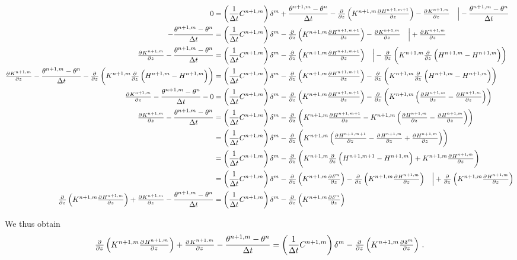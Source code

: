\begin{landscape}
  \begin{align*}
    0 &= \del{\frac{1}{\Delta t} C^{n+1,m}} \delta^m + \frac{\theta^{n+1,m} - \theta^n}{\Delta t} - \pd{}{z} \del{ K^{n+1,m}\pd{H^{n+1,m+1}}{z} } - \pd{K^{n+1,m}}{z} \quad \Bigr\rvert - \frac{\theta^{n+1,m} - \theta^n}{\Delta t} \\
    - \frac{\theta^{n+1,m} - \theta^n}{\Delta t} &= \del{\frac{1}{\Delta t} C^{n+1,m}} \delta^m - \pd{}{z} \del{ K^{n+1,m}\pd{H^{n+1,m+1}}{z} } - \pd{K^{n+1,m}}{z} \quad \Bigr\rvert + \pd{K^{n+1,m}}{z} \\
    \pd{K^{n+1,m}}{z} - \frac{\theta^{n+1,m} - \theta^n}{\Delta t} &= \del{\frac{1}{\Delta t} C^{n+1,m}} \delta^m - \pd{}{z} \del{ K^{n+1,m}\pd{H^{n+1,m+1}}{z} } \quad \Bigr\rvert - \pd{}{z} \del{ K^{n+1,m}\pd{}{z}\del{ H^{n+1,m} - H^{n+1,m} } } \\
    \pd{K^{n+1,m}}{z} - \frac{\theta^{n+1,m} - \theta^n}{\Delta t} - \pd{}{z} \del{ K^{n+1,m}\pd{}{z}\del{ H^{n+1,m} - H^{n+1,m} } } &= \del{\frac{1}{\Delta t} C^{n+1,m}} \delta^m - \pd{}{z} \del{ K^{n+1,m}\pd{H^{n+1,m+1}}{z} } - \pd{}{z} \del{ K^{n+1,m}\pd{}{z}\del{ H^{n+1,m} - H^{n+1,m} } } \\
    \pd{K^{n+1,m}}{z} - \frac{\theta^{n+1,m} - \theta^n}{\Delta t} - 0 &= \del{ \frac{1}{\Delta t} C^{n+1,m} } \delta^m - \pd{}{z} \del{ K^{n+1,m}\pd{H^{n+1,m+1}}{z} } - \pd{}{z} \del{ K^{n+1,m}\del{ \pd{H^{n+1,m}}{z} - \pd{H^{n+1,m}}{z} } } \\
    \pd{K^{n+1,m}}{z} - \frac{\theta^{n+1,m} - \theta^n}{\Delta t} &= \del{ \frac{1}{\Delta t} C^{n+1,m} } \delta^m - \pd{}{z} \del{ K^{n+1,m}\pd{H^{n+1,m+1}}{z} - K^{n+1,m}\del{ \pd{H^{n+1,m}}{z} - \pd{H^{n+1,m}}{z} } } \\
      &= \del{ \frac{1}{\Delta t} C^{n+1,m} } \delta^m - \pd{}{z} \del{ K^{n+1,m} \del{ \pd{H^{n+1,m+1}}{z} - \pd{H^{n+1,m}}{z} + \pd{H^{n+1,m}}{z} } } \\
      &= \del{ \frac{1}{\Delta t} C^{n+1,m} } \delta^m - \pd{}{z} \del{ K^{n+1,m} \pd{}{z} \del{ H^{n+1,m+1} - H^{n+1,m} } + K^{n+1,m} \pd{H^{n+1,m}}{z} } \\
      &= \del{ \frac{1}{\Delta t} C^{n+1,m} } \delta^m - \pd{}{z} \del{ K^{n+1,m} \pd{\delta^m}{z} } - \pd{}{z} \del{ K^{n+1,m} \pd{H^{n+1,m}}{z} } \quad \Bigr\rvert + \pd{}{z} \del{ K^{n+1,m} \pd{H^{n+1,m}}{z} } \\
    \pd{}{z} \del{ K^{n+1,m} \pd{H^{n+1,m}}{z} } + \pd{K^{n+1,m}}{z} - \frac{\theta^{n+1,m} - \theta^n}{\Delta t} &= \del{ \frac{1}{\Delta t} C^{n+1,m} } \delta^m - \pd{}{z} \del{ K^{n+1,m} \pd{\delta^m}{z} }
  \end{align*}
\end{landscape}
\newpage
We thus obtain
\begin{equation}
  \label{eq:celia_17}
  \pd{}{z} \del{ K^{n+1,m} \pd{H^{n+1,m}}{z} } + \pd{K^{n+1,m}}{z} - \frac{\theta^{n+1,m} - \theta^n}{\Delta t} = \del{ \frac{1}{\Delta t} C^{n+1,m} } \delta^m - \pd{}{z} \del{ K^{n+1,m} \pd{\delta^m}{z} } \, .
\end{equation}




